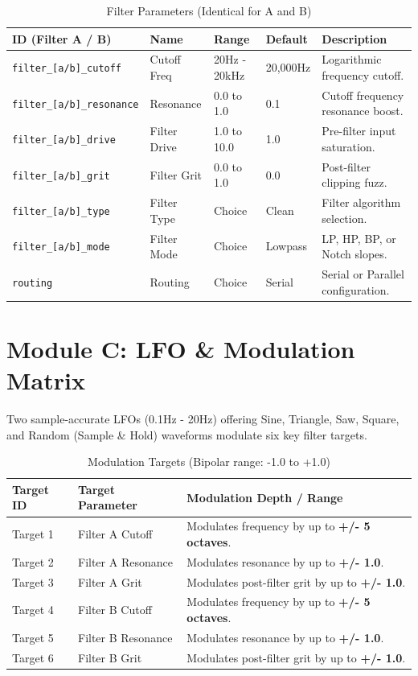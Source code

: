 \documentclass[11pt,a4paper,oneside]{book}
\begin{document}
\begin{table}[h]
    \centering
    \caption{Filter Parameters (Identical for A and B)}
    \begin{tabular}{lllll}
        \toprule
        \textbf{ID (Filter A / B)} & \textbf{Name} & \textbf{Range} & \textbf{Default} & \textbf{Description} \\
        \midrule
        \texttt{filter\_[a/b]\_cutoff} & Cutoff Freq & 20Hz - 20kHz & 20,000Hz & Logarithmic frequency cutoff. \\
        \texttt{filter\_[a/b]\_resonance} & Resonance & 0.0 to 1.0 & 0.1 & Cutoff frequency resonance boost. \\
        \texttt{filter\_[a/b]\_drive} & Filter Drive & 1.0 to 10.0 & 1.0 & Pre-filter input saturation. \\
        \texttt{filter\_[a/b]\_grit} & Filter Grit & 0.0 to 1.0 & 0.0 & Post-filter clipping fuzz. \\
        \texttt{filter\_[a/b]\_type} & Filter Type & Choice & Clean & Filter algorithm selection. \\
        \texttt{filter\_[a/b]\_mode} & Filter Mode & Choice & Lowpass & LP, HP, BP, or Notch slopes. \\
        \texttt{routing} & Routing & Choice & Serial & Serial or Parallel configuration. \\
        \bottomrule
    \end{tabular}
\end{table}

\section{Module C: LFO \& Modulation Matrix}
Two sample-accurate LFOs (0.1Hz - 20Hz) offering Sine, Triangle, Saw, Square, and Random (Sample \& Hold) waveforms modulate six key filter targets.

\begin{table}[h]
    \centering
    \caption{Modulation Targets (Bipolar range: -1.0 to +1.0)}
    \begin{tabular}{lll}
        \toprule
        \textbf{Target ID} & \textbf{Target Parameter} & \textbf{Modulation Depth / Range} \\
        \midrule
        Target 1 & Filter A Cutoff & Modulates frequency by up to \textbf{+/- 5 octaves}. \\
        Target 2 & Filter A Resonance & Modulates resonance by up to \textbf{+/- 1.0}. \\
        Target 3 & Filter A Grit & Modulates post-filter grit by up to \textbf{+/- 1.0}. \\
        Target 4 & Filter B Cutoff & Modulates frequency by up to \textbf{+/- 5 octaves}. \\
        Target 5 & Filter B Resonance & Modulates resonance by up to \textbf{+/- 1.0}. \\
        Target 6 & Filter B Grit & Modulates post-filter grit by up to \textbf{+/- 1.0}. \\
        \bottomrule
    \end{tabular}
\end{table}
\end{document}

